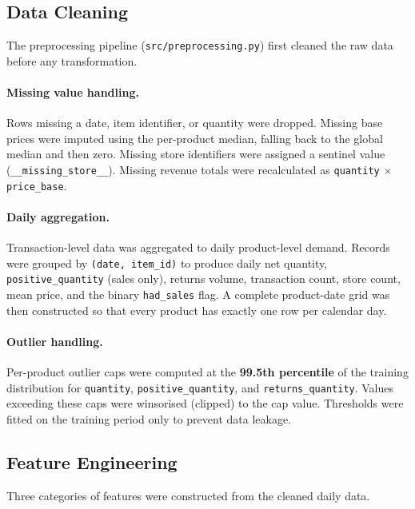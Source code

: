 \documentclass[12pt, a4paper]{article}
\begin{document}
\subsection{Data Cleaning}
\label{subsec:cleaning}

The preprocessing pipeline (\texttt{src/preprocessing.py}) first cleaned the raw data
before any transformation.

\paragraph{Missing value handling.}
Rows missing a date, item identifier, or quantity were dropped. Missing base prices were
imputed using the per-product median, falling back to the global median and then zero.
Missing store identifiers were assigned a sentinel value
(\texttt{\_\_missing\_store\_\_}). Missing revenue totals were recalculated as
\texttt{quantity} $\times$ \texttt{price\_base}.

\paragraph{Daily aggregation.}
Transaction-level data was aggregated to daily product-level demand. Records were
grouped by \texttt{(date, item\_id)} to produce daily net quantity,
\texttt{positive\_quantity} (sales only), returns volume, transaction count, store count,
mean price, and the binary \texttt{had\_sales} flag. A complete product-date grid was
then constructed so that every product has exactly one row per calendar day.

\paragraph{Outlier handling.}
Per-product outlier caps were computed at the \textbf{99.5th percentile} of the training
distribution for \texttt{quantity}, \texttt{positive\_quantity}, and
\texttt{returns\_quantity}. Values exceeding these caps were winsorised (clipped) to the
cap value. Thresholds were fitted on the training period only to prevent data leakage.

\subsection{Feature Engineering}
\label{subsec:features}

Three categories of features were constructed from the cleaned daily data.
\end{document}
